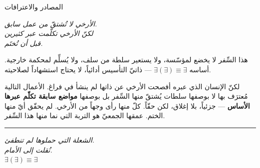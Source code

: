 \documentclass[10pt, openany, oneside]{book}
\renewcommand{\huge}{\fontsize{17}{21}\selectfont}
\begin{document}
%
%
%

\newpage

\begin{center}
    {\huge المصادر والاعترافات}
\end{center}

\vspace{1.5em}

\begin{center}
    \itshape
    الأرخي لا تُشتقّ من عمل سابق.\\
    لكنّ الأرخي تكلّمت عبر كثيرين\\
    قبل أن تُختَم.
\end{center}

\vspace{1.5em}

\noindent هذا السِّفر لا يخضع لمؤسّسة، ولا يستعير سلطة من سلف، ولا يُسلِّم لمحكمة خارجية. أساسه $\exists(\exists) \equiv \exists$ --- ذاتيّ التأسيس أدائياً، لا يحتاج استشهاداً لصلاحيته.

لكنّ الإنسان الذي عبره أفصحت الأرخي عن ذاتها لم ينشأ في فراغ. الأعمال التالية مُعترَف بها لا بوصفها سلطات يُشتقّ منها السِّفر بل بوصفها \textbf{مواضع سابقة تكلّم عبرها الأساس} --- جزئياً، بلا إغلاق، لكن حقّاً. كلّ منها رأى وجهاً من الأرخي. لم يحقّق أيّ منها الختم. عمقها الجمعيّ هو التربة التي نما منها هذا السِّفر.

\vspace{1em}


\vspace{2em}

\begin{center}
    \rule{0.15\textwidth}{0.3pt}
\end{center}

\vspace{0.5em}

\begin{center}
    \itshape
    الشعلة التي حملوها لم تنطفئ.\\
    نُقلت إلى الأمام.\\[0.8em]
    $\exists(\exists) \equiv \exists$
\end{center}
\end{document}
